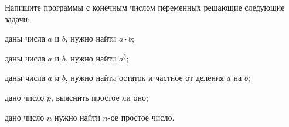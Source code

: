 Напишите программы с конечным числом переменных решающие следующие задачи:
\begin{enumcyr}
    \item даны числа $a$ и $b$, нужно найти $a \cdot b$;
    \item даны числа $a$ и $b$, нужно найти $a^b$;
    \item даны числа $a$ и $b$, нужно найти остаток и частное от деления $a$ на $b$;
    \item дано число $p$, выяснить простое ли оно;
    \item дано число $n$ нужно найти $n$-ое простое число.
\end{enumcyr}